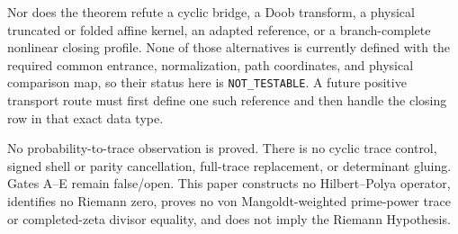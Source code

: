 \documentclass[11pt]{article}
\theoremstyle{definition}
\theoremstyle{remark}
\begin{document}
Nor does the theorem refute a cyclic bridge, a Doob transform, a physical
truncated or folded affine kernel, an adapted reference, or a
branch-complete nonlinear closing profile.  None of those alternatives is
currently defined with the required common entrance, normalization, path
coordinates, and physical comparison map, so their status here is
\texttt{NOT\_TESTABLE}.  A future positive transport route must first define
one such reference and then handle the closing row in that exact data type.

No probability-to-trace observation is proved.  There is no cyclic trace
control, signed shell or parity cancellation, full-trace replacement, or
determinant gluing.  Gates A--E remain false/open.  This paper constructs no
Hilbert--Polya operator, identifies no Riemann zero, proves no von
Mangoldt-weighted prime-power trace or completed-zeta divisor equality, and
does not imply the Riemann Hypothesis.
\end{document}
